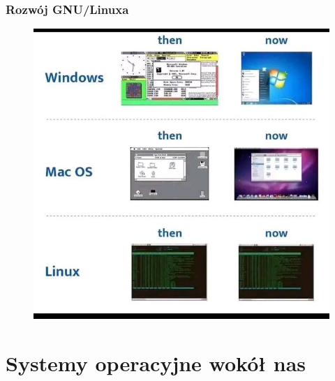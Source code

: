 \documentclass[10pt,t]{beamer}
\begin{document}
\begin{frame}
  \frametitle{Rozwój GNU/Linuxa}

  \vspace{-0.5em}


  \begin{figure}

    \label{fig:Evolution-of-OS}

    \centering


    \includegraphics[scale=0.3]
    {./Presentations-pictures/Miscancellous-pictures/Evolution-of-operating-systems.jpg}

  \end{figure}

\end{frame}










\section{Systemy operacyjne wokół nas}
\end{document}
